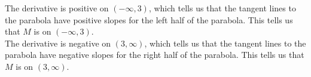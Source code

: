 \documentclass{ximera}
\begin{document}
\begin{example}
\begin{explanation}
The derivative is positive on $(-\infty, 3)$, which tells us that the tangent lines to the parabola have positive slopes for the left half of the parabola. This tells us that $M$ is   on $(-\infty, 3)$. \\

The derivative is negative on $(3, \infty)$, which tells us that the tangent lines to the parabola have negative slopes for the right half of the parabola. This tells us that $M$ is   on $(3, \infty)$. \\


\end{explanation}

\end{example}
\end{document}
